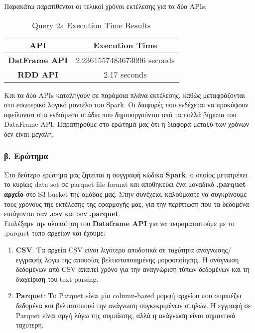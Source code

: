 \documentclass{article}
\begin{document}
Παρακάτω παρατίθενται οι τελικοί χρόνοι εκτέλεσης για τα δύο APIs: \\

\begin{table}[H]
\centering
\caption{Query 2a Execution Time Results}
\label{tab:query2a_execution_times}
\begin{tabular}{|c|c|}
\hline
\textbf{API}			& 		\textbf{Execution Time}			\\ \hline
\textbf{DatFrame API}	&		2.2361557483673096 seconds		\\ \hline
\textbf{RDD API}		&		2.17 seconds						\\ \hline
\end{tabular}
\end{table}

Και τα δύο APIs καταλήγουν σε παρόμοια πλάνα εκτέλεσης, καθώς μεταφράζονται
στο εσωτερικό λογικό μοντέλο του Spark. Οι διαφορές που ενδέχεται να προκύψουν
οφείλονται στα ενδιάμεσα στάδια που δημιουργούνται από τα πολλά βήματα του
DataFrame API. Παρατηρούμε στο ερώτημά μας ότι η διαφορά μεταξύ των χρόνων
δεν είναι μεγάλη.

\subsubsection*{\large  β. Ερώτημα}
Στο δεύτερο ερώτημα μας ζητείται η συγγραφή κώδικα \textbf{Spark}, ο οποίος μετατρέπει το κυρίως data set σε parquet file format και αποθηκεύει ένα μοναδικό \textbf{.parquet αρχείο} στο S3 bucket της ομάδας μας. Στην συνέχεια, καλούμαστε να συγκρίνουμε τους χρόνους της εκτέλεσης της εφαρμογής μας, για την περίπτωση που τα δεδομένα εισάγονται σαν \textbf{.csv} και σαν \textbf{.parquet}.  \\

Επιλέξαμε την υλοποίηση του \textbf{Dataframe API} για να πειραματιστούμε με το
.parquet τύπο αρχείων και έχουμε:
\begin{enumerate}
	\item \textbf{CSV}: Τα αρχεία CSV είναι λιγότερο αποδοτικά σε ταχύτητα
						ανάγνωσης/εγγραφής λόγω της απουσίας βελτιστοποιημένης μορφοποίησης.
						Η ανάγνωση δεδομένων από CSV απαιτεί χρόνο για την αναγνώριση τύπων
						δεδομένων και τη διαχείριση του text parsing.
	\item \textbf{Parquet}: Το Parquet είναι μία column-based μορφή αρχείου που συμπιέζει
						δεδομένα και βελτιστοποιεί την ανάγνωση συγκεκριμένων στηλών. Η εγγραφή
						σε Parquet είναι αργή λόγω της συμπίεσης, αλλά η ανάγνωση είναι σημαντικά
						ταχύτερη.
\end{enumerate}
\end{document}
